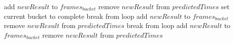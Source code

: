 ﻿\documentclass[a4paper]{article}
\begin{document}
\begin{algorithm}
\begin{algorithmic}[1]
                                        \State add $newResult$ to $frames_{bucket}$
                                        \State remove $newResult$ from $predictedTimes$
                                        \State set current bucket to complete
                                        \State break from loop
                                    \EndIf
                                \Else
                                    \State add $newResult$ to $frames_{bucket}$
                                    \State remove $newResult$ from $predictedTimes$
                                    \State break from loop
                                \EndIf
                            \EndFor
                        \Else
                            \State add $newResult$ to $frames_{bucket}$
                            \State remove $newResult$ from $predictedTimes$
                        \EndIf
                    \EndIf
                \EndFor
            \EndWhile
        \end{algorithmic}
    \end{algorithm}
\end{document}
